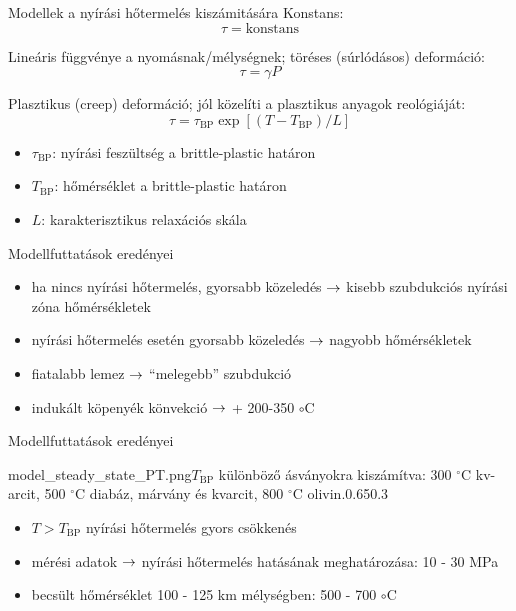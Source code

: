 \documentclass{beamer}
\begin{document}
\begin{frame}{Modellek a nyírási hőtermelés kiszámitására}
    Konstans:
    \[
        \tau = \text{konstans}
    \]

    Lineáris függvénye a nyomásnak/mélységnek; töréses (súrlódásos) deformáció:
    \[
        \tau = \gamma P
    \]
    
    
    Plasztikus (creep) deformáció; jól közelíti a plasztikus anyagok reológiáját:
    \[
        \tau = \tau_{\text{BP}} \exp{[(T - T_{\text{BP}}) / L]}
    \]
    
    \begin{itemize}
        \item $\tau_{\text{BP}}$: nyírási feszültség a brittle-plastic határon
        \item $T_{\text{BP}}$: hőmérséklet a brittle-plastic határon
        \item $L$: karakterisztikus relaxációs skála
    \end{itemize}
\end{frame}


\begin{frame}{Modellfuttatások eredényei}
    \begin{minipage}[c]{0.65\textwidth}
        \centering
        \begin{itemize}
            \item ha nincs nyírási hőtermelés, gyorsabb közeledés $\rightarrow$ kisebb szubdukciós nyírási zóna hőmérsékletek
        \end{itemize}
    \end{minipage}
    \begin{minipage}[c]{0.3\textwidth}
        \begin{itemize}
            \item nyírási hőtermelés esetén gyorsabb közeledés $\rightarrow$ nagyobb hőmérsékletek
            \item fiatalabb lemez $\rightarrow$ ``melegebb'' szubdukció
            \item indukált köpenyék könvekció $\rightarrow$ + 200-350 $\circ$C
        \end{itemize}
    \end{minipage}
\end{frame}


\begin{frame}{Modellfuttatások eredényei}
    \begin{figp}{model_steady_state_PT.png}{$T_{\text{BP}}$ különböző ásványokra kiszámítva: 300 $^\circ$C kv-arcit, 500 $^\circ$C diabáz, márvány és kvarcit, 800 $^\circ$C olivin.}{0.65}{0.3}
        \begin{itemize}
            \item $ T > T_{\text{BP}}$ nyírási hőtermelés gyors csökkenés
            \item mérési adatok $\rightarrow$ nyírási hőtermelés hatásának meghatározása: 10 - 30 MPa
            \item becsült hőmérséklet 100 - 125 km mélységben: 500 - 700 $\circ$C
        \end{itemize}
    \end{figp}
\end{frame}
\end{document}
